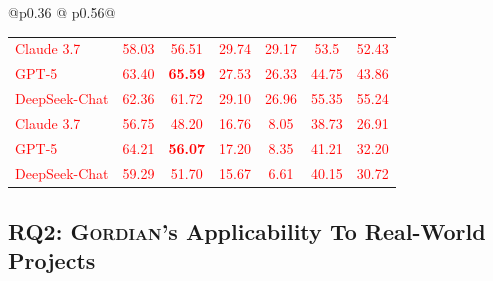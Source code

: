 \documentclass[acmsmall,screen,nonacm]{acmart}
\newcommand{\rev}[1]{\textcolor{red}{#1}}
\newcommand{\rev}[1]{#1}
\newcommand{\projName}{\textsc{Gordian}\xspace}
\theoremstyle{definition}
\begin{document}
\begin{table}[ht!]
\begin{tabular}{@{}p{}
@{\hspace{0.00\columnwidth}}
p{}@{}}
\begin{tabular}{|l|cc|cc|cc|}
\midrule
\rev{Claude 3.7}    & \rev{58.03} & \rev{56.51} & \rev{29.74} & \rev{29.17} & \rev{53.5} & \rev{52.43} \\
\rev{GPT-5}         & \rev{63.40} & \rev{\textbf{65.59}} & \rev{27.53} & \rev{26.33} & \rev{44.75} & \rev{43.86} \\
\rev{DeepSeek-Chat} & \rev{62.36} & \rev{61.72} & \rev{29.10} & \rev{26.96} & \rev{55.35} & \rev{55.24} \\
\midrule
\midrule
\rev{Claude 3.7}    & \rev{56.75} & \rev{48.20} & \rev{16.76} & \rev{8.05} & \rev{38.73} & \rev{26.91} \\
\rev{GPT-5}         & \rev{64.21} & \rev{\textbf{56.07}} & \rev{17.20} & \rev{8.35} & \rev{41.21} & \rev{32.20} \\
\rev{DeepSeek-Chat} & \rev{59.29} & \rev{51.70} & \rev{15.67} & \rev{6.61} & \rev{40.15} & \rev{30.72} \\
\bottomrule
\end{tabular}

\end{tabular}
\vspace{-4mm}
\end{table}


\subsection{RQ2: \projName's Applicability To Real-World Projects}
\end{document}
